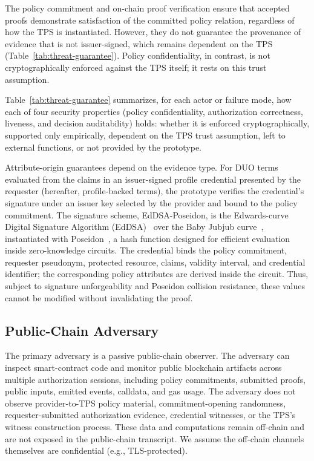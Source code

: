 The policy commitment and on-chain proof verification ensure that accepted proofs demonstrate satisfaction of the committed policy relation, regardless of how the TPS is instantiated.
However, they do not guarantee the provenance of evidence that is not issuer-signed, which remains dependent on the TPS (Table~\ref{tab:threat-guarantee}).
Policy confidentiality, in contrast, is not cryptographically enforced against the TPS itself; it rests on this trust assumption.

Table~\ref{tab:threat-guarantee} summarizes, for each actor or failure mode, how each of four security properties (policy confidentiality, authorization correctness, liveness, and decision auditability) holds: whether it is enforced cryptographically, supported only empirically, dependent on the TPS trust assumption, left to external functions, or not provided by the prototype.


Attribute-origin guarantees depend on the evidence type.
For DUO terms evaluated from the claims in an issuer-signed profile credential presented by the requester (hereafter, profile-backed terms), the prototype verifies the credential's signature under an issuer key selected by the provider and bound to the policy commitment.
The signature scheme, EdDSA-Poseidon, is the Edwards-curve Digital Signature Algorithm (EdDSA)~\cite{bernstein2012high} over the Baby Jubjub curve~\cite{whitehat2020babyjubjub}, instantiated with Poseidon~\cite{grassi2021poseidon}, a hash function designed for efficient evaluation inside zero-knowledge circuits.
The credential binds the policy commitment, requester pseudonym, protected resource, claims, validity interval, and credential identifier; the corresponding policy attributes are derived inside the circuit.
Thus, subject to signature unforgeability and Poseidon collision resistance, these values cannot be modified without invalidating the proof.

\subsection{Public-Chain Adversary}

The primary adversary is a passive public-chain observer.
The adversary can inspect smart-contract code and monitor public blockchain artifacts across multiple authorization sessions, including policy commitments, submitted proofs, public inputs, emitted events, calldata, and gas usage.
The adversary does not observe provider-to-TPS policy material, commitment-opening randomness, requester-submitted authorization evidence, credential witnesses, or the TPS's witness construction process.
These data and computations remain off-chain and are not exposed in the public-chain transcript.
We assume the off-chain channels themselves are confidential (e.g., TLS-protected).

